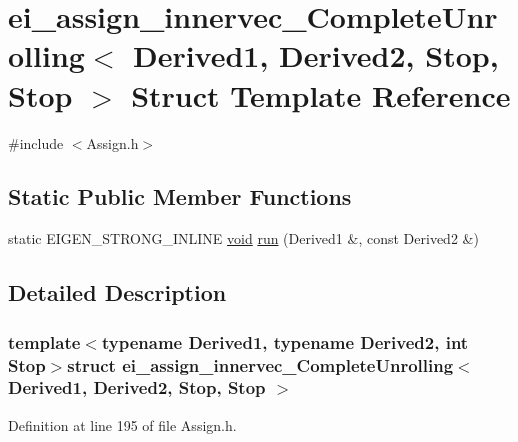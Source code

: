 \hypertarget{structei__assign__innervec___complete_unrolling_3_01_derived1_00_01_derived2_00_01_stop_00_01_stop_01_4}{\section{ei\-\_\-assign\-\_\-innervec\-\_\-\-Complete\-Unrolling$<$ Derived1, Derived2, Stop, Stop $>$ Struct Template Reference}
\label{structei__assign__innervec___complete_unrolling_3_01_derived1_00_01_derived2_00_01_stop_00_01_stop_01_4}
}


{\ttfamily \#include $<$Assign.\-h$>$}

\subsection*{Static Public Member Functions}
\begin{DoxyCompactItemize}
\item 
static E\-I\-G\-E\-N\-\_\-\-S\-T\-R\-O\-N\-G\-\_\-\-I\-N\-L\-I\-N\-E \hyperlink{group___u_a_v_objects_plugin_ga444cf2ff3f0ecbe028adce838d373f5c}{void} \hyperlink{structei__assign__innervec___complete_unrolling_3_01_derived1_00_01_derived2_00_01_stop_00_01_stop_01_4_ae13e4886e273ccc4e78ebb2ff5f7d1b4}{run} (Derived1 \&, const Derived2 \&)
\end{DoxyCompactItemize}


\subsection{Detailed Description}
\subsubsection*{template$<$typename Derived1, typename Derived2, int Stop$>$struct ei\-\_\-assign\-\_\-innervec\-\_\-\-Complete\-Unrolling$<$ Derived1, Derived2, Stop, Stop $>$}



Definition at line 195 of file Assign.\-h.



